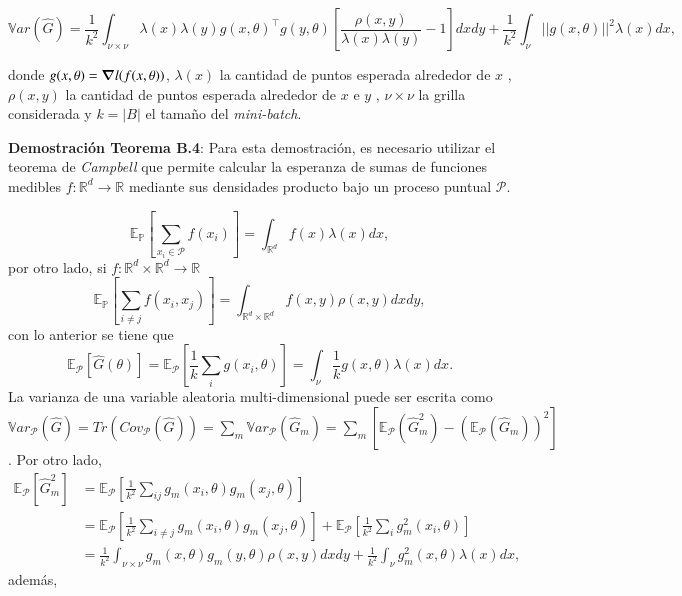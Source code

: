 \begin{appendixs}
\begin{teo}
    \[
        \mathbb{V}ar(\hat{G}) = \frac{1}{k^2}\int_{\nu \times \nu}\lambda(x)\lambda(y)g(x,\theta)^{\top}g(y,\theta)\left [ \frac{\rho(x,y)}{\lambda(x)\lambda(y)} - 1\right ]dxdy
        + \frac{1}{k^2} \int_{\nu} ||g(x,\theta)||^2\lambda(x)dx , 
    \]
    
    \noindent donde $g(x,\theta) = \grad l(f(x, \theta))$, $\lambda(x)$ la cantidad de puntos esperada alrededor de $x$ , $\rho(x,y)$ la cantidad de puntos esperada alrededor de $x$ e $y$ , $\nu \times \nu$ la grilla considerada y $k = |B|$ el tamaño del \textit{mini-batch}. 
    \end{teo}
    
    \vspace{0.2cm}
    
    \noindent \textbf{Demostración Teorema B.4}: 
    Para esta demostración, es necesario utilizar el teorema de \textit{Campbell} que permite calcular la esperanza de sumas de funciones medibles $f: \mathbb{R}^d \rightarrow \mathbb{R}$ mediante sus densidades producto bajo un proceso puntual $\mathcal{P}$.
    
    \[
    \mathbb{E}_{\mathbb{P}}\left [ \sum_{x_i \in \mathcal{P}} f(x_i) \right] = \int_{\mathbb{R}^d} f(x)\lambda(x)dx , 
    \] 
    por otro lado, si $f: \mathbb{R}^d \times  \mathbb{R}^d \rightarrow \mathbb{R}$
    \[
    \mathbb{E}_{\mathbb{P}} \left [ \sum_{i \neq j} f(x_i,x_j) \right] = \int_{ \mathbb{R}^d \times  \mathbb{R}^d} f(x,y)\rho(x,y)dxdy , 
    \]
    con lo anterior se tiene que 
    \[
    \mathbb{E}_{\mathcal{P}}\left [ \hat{G}(\theta) \right] = \mathbb{E}_{\mathcal{P}} \left [ \frac{1}{k}\sum_{i}g(x_i,\theta) \right] = \int_{\nu} \frac{1}{k}g(x,\theta)\lambda(x)dx . 
    \] 
    La varianza de una variable aleatoria multi-dimensional puede ser escrita como $\mathbb{V}ar_{\mathcal{P}}(\hat{G}) = Tr(Cov_{\mathcal{P}}(\hat{G})) = \sum_m \mathbb{V}ar_{\mathcal{P}}(\hat{G}_m) = \sum_m \left [ \mathbb{E}_{\mathcal{P}}(\hat{G}^2_m) - (\mathbb{E}_{\mathcal{P}}(\hat{G}_m))^2 \right ]$. Por otro lado, 
    \begin{align*}
        \mathbb{E}_{\mathcal{P}}[\hat{G}^2_m] &= \mathbb{E}_{\mathcal{P}} \left [ \frac{1}{k^2} \sum_{ij} g_m(x_i, \theta)g_m(x_j,\theta) \right ] \\  
        &= \mathbb{E}_{\mathcal{P}} \left [ \frac{1}{k^2} \sum_{i \neq j} g_m(x_i, \theta)g_m(x_j,\theta) \right ] + \mathbb{E}_{\mathcal{P}} \left [ \frac{1}{k^2} \sum_{i} g_m^2(x_i, \theta)\right ] \\
        &= \frac{1}{k^2}\int_{\nu \times \nu}g_m(x,\theta)g_m(y,\theta)\rho(x,y)dxdy + \frac{1}{k^2}\int_{\nu}g^2_m(x,\theta)\lambda(x)dx , 
    \end{align*}
    además, 
    

\end{appendixs}
